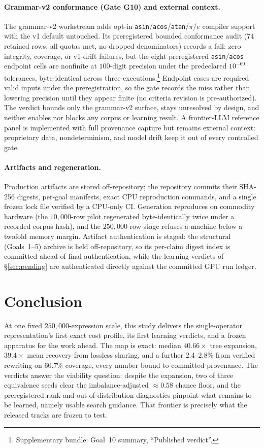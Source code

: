 \documentclass[11pt]{article}
\newcommand{\anchor}[1]{\footnote{#1}}
\begin{document}
\paragraph{Grammar-v2 conformance (Gate G10) and external context.} The
grammar-v2 workstream adds opt-in
\texttt{asin}/\texttt{acos}/\texttt{atan}/$\pi$/$e$ compiler support with the
v1 default untouched. Its preregistered bounded conformance audit ($74$
retained rows, all quotas met, no dropped denominators) records a fail: zero
integrity, coverage, or v1-drift failures, but the eight preregistered
\texttt{asin}/\texttt{acos} endpoint cells are nonfinite at $100$-digit
precision under the predeclared $10^{-60}$ tolerances, byte-identical across
three executions.\anchor{Supplementary bundle: Goal~10 summary, ``Published
verdict''.} Endpoint cases are required valid inputs under
the preregistration, so the gate records the miss rather than lowering
precision until they appear finite (no criteria revision is pre-authorized).
The verdict bounds only the grammar-v2 surface, stays unresolved by design,
and neither enables nor blocks any corpus or learning result. A frontier-LLM
reference panel is implemented with full provenance capture but remains
external context: proprietary data, nondeterminism, and model drift keep it
out of every controlled gate.

\paragraph{Artifacts and regeneration.} Production artifacts are stored
off-repository; the repository commits their SHA-256 digests, per-goal manifests,
exact CPU reproduction commands, and a single frozen lock file verified by a
CPU-only CI. Generation reproduces on commodity hardware (the $10{,}000$-row pilot
regenerated byte-identically twice under a recorded corpus hash), and the
$250{,}000$-row stage refuses a machine below a twofold memory margin.
Artifact authentication is staged: the structural (Goals~1--5) archive is held
off-repository, so its per-claim digest index is committed ahead of final
authentication, while the learning verdicts of \S\ref{sec:pending} are
authenticated directly against the committed GPU run ledger.

\section{Conclusion}

At one fixed $250{,}000$-expression scale, this study delivers the
single-operator representation's first exact cost profile, its first
learning verdicts, and a frozen apparatus for the work ahead.
The map is exact: median $40.66\times$ tree expansion, $39.4\times$ mean
recovery from lossless sharing, and a further $2.4$--$2.8\%$ from verified
rewriting on $60.7\%$ coverage, every number bound to committed provenance.
The verdicts answer the viability question: despite the expansion, two of
three equivalence seeds clear the imbalance-adjusted ${\approx}0.58$ chance
floor, and the preregistered rank and out-of-distribution diagnostics pinpoint
what remains to be learned, namely usable search guidance. That frontier is
precisely what the released tracks are frozen to test.
\end{document}

